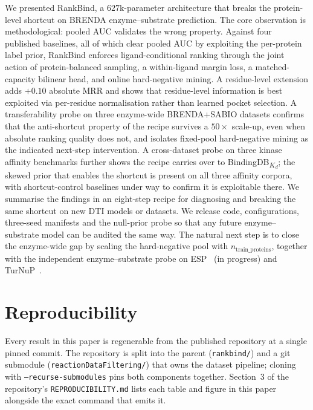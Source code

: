 \documentclass[11pt,a4paper]{article}
\newcommand{\method}{RankBind\xspace}
\begin{document}
We presented \method, a $627$k-parameter architecture that breaks the
protein-level shortcut on BRENDA enzyme--substrate prediction. The
core observation is methodological: pooled AUC validates the wrong
property. Against four published baselines, all of which clear pooled
AUC by exploiting the per-protein label prior, \method enforces
ligand-conditional ranking through the joint action of
protein-balanced sampling, a within-ligand margin loss, a
matched-capacity bilinear head, and online hard-negative mining. A
residue-level extension adds $+0.10$ absolute MRR and shows that
residue-level information is best exploited via per-residue
normalisation rather than learned pocket selection. A transferability
probe on three enzyme-wide BRENDA+SABIO datasets confirms that the
anti-shortcut property of the recipe survives a $50\times$ scale-up,
even when absolute ranking quality does not, and isolates
fixed-pool hard-negative mining as the indicated next-step
intervention. A cross-dataset probe on three kinase affinity
benchmarks further shows the recipe carries over to
BindingDB\textsubscript{$K_d$}; the skewed prior that enables the
shortcut is present on all three affinity corpora, with shortcut-control
baselines under way to confirm it is exploitable there. We summarise the
findings in an eight-step recipe for diagnosing and breaking the same
shortcut on new DTI models or datasets. We release code,
configurations, three-seed manifests and the null-prior probe so that
any future enzyme--substrate model can be audited the same way. The
natural next step is to close the enzyme-wide gap by scaling the
hard-negative pool with $n_{\text{train\_proteins}}$, together with the
independent enzyme--substrate probe on ESP~\citep{kroll2023esp} (in
progress) and TurNuP~\citep{kroll2023turnup}.

\appendix
\section{Reproducibility}
\label{app:repro}

Every result in this paper is regenerable from the published
repository at a single pinned commit. The repository is split into the
parent (\texttt{rankbind/}) and a git submodule
(\texttt{reactionDataFiltering/}) that owns the dataset pipeline;
cloning with \texttt{--recurse-submodules} pins both components
together. Section~3 of the repository's \texttt{REPRODUCIBILITY.md}
lists each table and figure in this paper alongside the exact command
that emits it.
\end{document}
